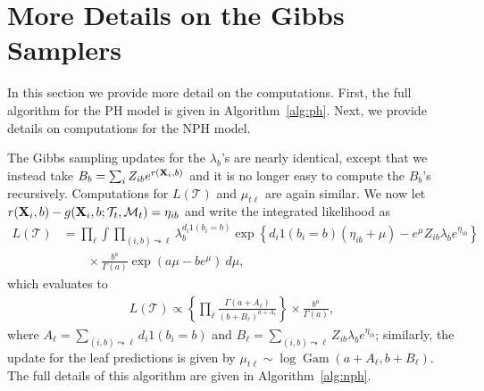 \documentclass[12pt]{article}
\newcommand{\Gam}{\operatorname{Gam}}
\newcommand{\sM}{\mathcal M}
\newcommand{\Tree}{\mathcal T}
\newcommand{\bfX}{{\bf X}}
\begin{document}



\appendix

\clearpage

\section{More Details on the Gibbs Samplers} \label{gibbs_ph}

In this section we provide more detail on the computations. First, the full algorithm for the PH model is given in Algorithm~\ref{alg:ph}. Next, we provide details on computations for the NPH model.

The Gibbs sampling updates for the $\lambda_b$'s are nearly identical, except that we instead take $B_b = \sum_i Z_{ib} e^{r(\bfX_i, b)}$ and it is no longer easy to compute the $B_b$'s recursively. Computations for $L(\Tree)$ and $\mu_{t\ell}$ are again similar. We now let $r(\bfX_i, b) - g(\bfX_i, b; \Tree_t, \sM_t) = \eta_{ib}$ and write the integrated likelihood as
\begin{align*}
    L(\Tree) &= \prod_\ell \int \prod_{(i,b) \leadsto \ell}
      \lambda_{b}^{d_i 1(b_i = b)} 
      \exp\left\{d_i 1(b_i = b) (\eta_{ib} + \mu)
      - e^{\mu} Z_{ib} \lambda_b e^{\eta_{ib}}\right\}
      \\&\qquad 
      \times \frac{b^a}{\Gamma(a)} \exp(a\mu - b e^\mu) \ d\mu,
\end{align*}
which evaluates to 
\begin{align*}
    L(\Tree) \propto \left\{\prod_\ell 
      \frac{\Gamma(a + A_\ell)}{(b + B_\ell)^{a + A_\ell}} \right\}
        \times \frac{b^a}{\Gamma(a)},
\end{align*}
where $A_\ell = \sum_{(i,b) \leadsto \ell} d_i 1(b_i = b)$ and $B_\ell = 
\sum_{(i,b) \leadsto \ell} Z_{ib} \lambda_b e^{\eta_{ib}}$; similarly, the 
update for the leaf predictions is given by $\mu_{t\ell} \sim \log \Gam(a + 
A_\ell, b + B_\ell)$. The full details of this algorithm are given in Algorithm~\ref{alg:nph}.
\end{document}
